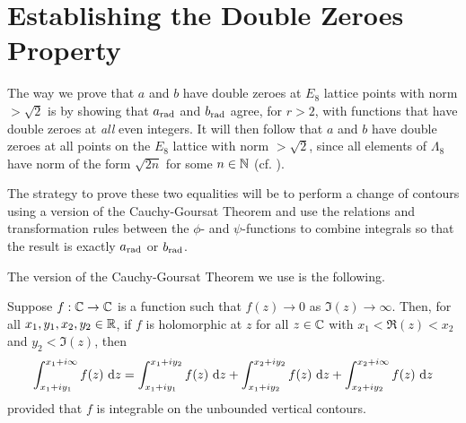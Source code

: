 \section{Establishing the Double Zeroes Property}
\label{Ch4:Sec:Double_Zeroes}


The way we prove that $a$ and $b$ have double zeroes at $E_8$ lattice points with norm $> \sqrt{2}$ is by showing that $a_{\operatorname{rad}}$ and $b_{\operatorname{rad}}$ agree, for $r > 2$, with functions that have double zeroes at \textit{all} even integers. It will then follow that $a$ and $b$ have double zeroes at all points on the $E_8$ lattice with norm $> \sqrt{2}$, since all elements of $\Lambda_8$ have norm of the form $\sqrt{2n}$ for some $n \in \mathbb{N}$ (cf. ).

The strategy to prove these two equalities will be to perform a change of contours using a version of the Cauchy-Goursat Theorem and use the relations and transformation rules between the $\phi$- and $\psi$-functions to combine integrals so that the result is exactly $a_{\operatorname{rad}}$ or $b_{\operatorname{rad}}$.

The version of the Cauchy-Goursat Theorem we use is the following.

\begin{boxtheorem}\label{Ch4:Thm:CauchyGoursat_Unbounded}
    Suppose $f : \mathbb{C} \to \mathbb{C}$ is a function such that $f(z) \to 0$ as $\Im(z) \to \infty$. Then, for all $x_1, y_1, x_2, y_2 \in \mathbb{R}$, if $f$ is holomorphic at $z$ for all $z \in \mathbb{C}$ with $x_1 < \Re(z) < x_2$ and $y_2 < \Im(z)$, then
    \begin{align*}
        \int_{x_1 + iy_1}^{x_1 + i\infty} f(z) \, \operatorname{d}\!{z}
        = \int_{x_1 + iy_1}^{x_1 + iy_2} f(z) \, \operatorname{d}\!{z}
        + \int_{x_1 + iy_2}^{x_2 + iy_2} f(z) \, \operatorname{d}\!{z}
        + \int_{x_2 + iy_2}^{x_2 + i\infty} f(z) \, \operatorname{d}\!{z}
    \end{align*}
    provided that $f$ is integrable on the unbounded vertical contours.
\end{boxtheorem}

